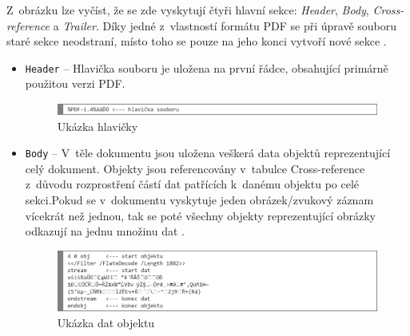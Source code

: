 Z~obrázku lze vyčíst, že se zde vyskytují čtyři hlavní sekce: \textit{Header}, \textit{Body}, \textit{Cross-reference} a \textit{Trailer}. Díky jedné z~vlastností formátu PDF se při úpravě souboru staré sekce neodstraní, místo toho se pouze na jeho konci vytvoří nové sekce \cite{PDFInfoSec}.
\begin{itemize}
	\item \verb|Header| -- Hlavička souboru je uložena na první řádce, obsahující primárně použitou verzi PDF.
	\begin{figure}[h!]
	\centering
	\includegraphics[width=15cm]{img/pdf_hlavicka}
	\caption{Ukázka hlavičky}
	\label{fig:pdf_header}
	\end{figure}
	
	\item \verb|Body| -- V~těle dokumentu jsou uložena veškerá data objektů reprezentující celý dokument. Objekty jsou referencovány v~tabulce Cross-reference z~důvodu rozprostření částí dat patřících k~danému objektu po celé sekci.Pokud se v~dokumentu vyskytuje jeden obrázek/zvukový záznam vícekrát než jednou, tak se poté všechny objekty reprezentující obrázky odkazují na jednu množinu dat \cite{PDFAdobe}.
	\begin{figure}[h!]
	\centering
	\includegraphics[width=15cm]{img/pdf_body}
	\caption{Ukázka dat objektu}
	\label{fig:pdf_body}
	\end{figure}


\end{itemize}
